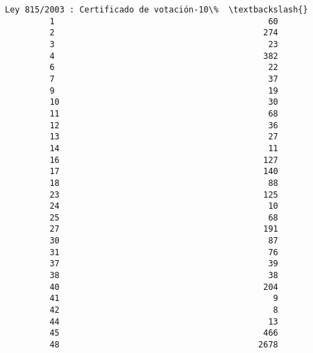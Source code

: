 \documentclass[11pt]{article}
\begin{document}
\begin{Verbatim}[commandchars=\\\{\}]
             Ley 815/2003 : Certificado de votación-10\%  \textbackslash{}
         1                                           60   
         2                                          274   
         3                                           23   
         4                                          382   
         6                                           22   
         7                                           37   
         9                                           19   
         10                                          30   
         11                                          68   
         12                                          36   
         13                                          27   
         14                                          11   
         16                                         127   
         17                                         140   
         18                                          88   
         23                                         125   
         24                                          10   
         25                                          68   
         27                                         191   
         30                                          87   
         31                                          76   
         37                                          39   
         38                                          38   
         40                                         204   
         41                                           9   
         42                                           8   
         44                                          13   
         45                                         466   
         48                                        2678   
         

\end{Verbatim}
\end{document}
